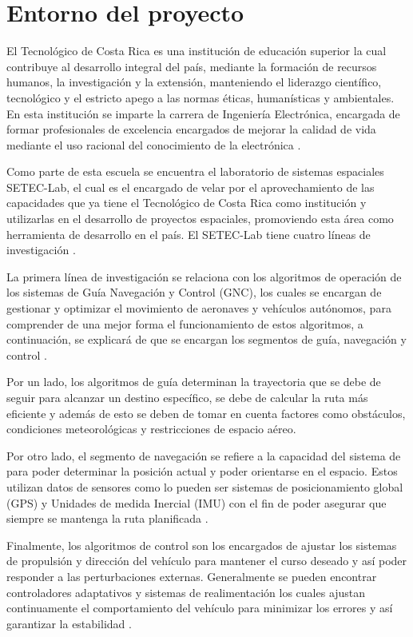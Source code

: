 \documentclass[12pt]{article}
\begin{document}
\newpage
\tableofcontents
\newpage

\section{Entorno del proyecto}
El Tecnológico de Costa Rica es una institución de educación superior la cual contribuye al desarrollo integral del país, mediante la formación de recursos humanos, la investigación y la extensión, manteniendo el liderazgo científico, tecnológico y el estricto apego a las normas éticas, humanísticas y ambientales. En esta institución se imparte la carrera de Ingeniería Electrónica, encargada de formar profesionales de excelencia encargados de mejorar la calidad de vida mediante el uso racional del conocimiento de la electrónica \cite{mision-vision-tec}.

Como parte de esta escuela se encuentra el laboratorio de sistemas espaciales SETEC-Lab, el cual es el encargado de velar por el aprovechamiento de las capacidades que ya tiene el Tecnológico de Costa Rica como institución y utilizarlas en el desarrollo de proyectos espaciales, promoviendo esta área como herramienta de desarrollo en el país. El SETEC-Lab tiene cuatro líneas de investigación \cite{setec-lab-def}. 

La primera línea de investigación se relaciona con los algoritmos de operación de los sistemas de Guía Navegación y Control (GNC), los cuales se encargan de gestionar y optimizar el movimiento de aeronaves y vehículos autónomos, para comprender de una mejor forma el funcionamiento de estos algoritmos, a continuación, se explicará de que se encargan los segmentos de guía, navegación y control \cite{moghaddam2021guidance}. 

Por un lado, los algoritmos de guía determinan la trayectoria que se debe de seguir para alcanzar un destino específico, se debe de calcular la ruta más eficiente y además de esto se deben de tomar en cuenta factores como obstáculos, condiciones meteorológicas y restricciones de espacio aéreo. 

Por otro lado, el segmento de navegación se refiere a la capacidad del sistema de para poder determinar la posición actual y poder orientarse en el espacio. Estos utilizan datos de sensores como lo pueden ser sistemas de posicionamiento global (GPS) y Unidades de medida Inercial (IMU) con el fin de poder asegurar que siempre se mantenga la ruta planificada \cite{Colmenarejo2024}. 

Finalmente, los algoritmos de control son los encargados de ajustar los sistemas de propulsión y dirección del vehículo para mantener el curso deseado y así poder responder a las perturbaciones externas. Generalmente se pueden encontrar controladores adaptativos y sistemas de realimentación los cuales ajustan continuamente el comportamiento del vehículo para minimizar los errores y así garantizar la estabilidad \cite{Balaram2008}.
 
\end{document}
